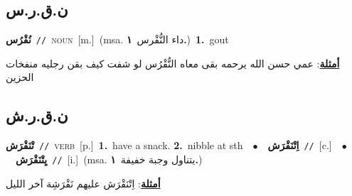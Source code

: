 \documentclass[10pt,a4paper,twoside]{article} %
\begin{document}
\begin{multicols}{2}
\vspace{-3mm}
\subsection*{\color{blue}\foreignlanguage{arabic}{ن.ق.ر.س}\color{blue}{}} 

{\setlength\topsep{0pt}\textbf{\foreignlanguage{arabic}{نُقْرُس}}\ {\color{gray}\texttt{//}\color{black}}\ \textsc{noun}\ [m.]\ \color{gray}(msa. \foreignlanguage{arabic}{داء النُّقْرس}~\foreignlanguage{arabic}{\textbf{١.}})\color{black}\ \textbf{1.}~gout\  \begin{flushright}\color{gray}\foreignlanguage{arabic}{\textbf{\underline{\foreignlanguage{arabic}{أمثلة}}}: عمي حسن الله يرحمه بقى معاه النُّقْرُس لو شفت كيف بقن رجليه منفخات الحزين}\end{flushright}\color{black}} \vspace{2mm}

\vspace{-3mm}
\subsection*{\color{blue}\foreignlanguage{arabic}{ن.ق.ر.ش}\color{blue}{}} 

{\setlength\topsep{0pt}\textbf{\foreignlanguage{arabic}{تْنَقْرَش}}\ {\color{gray}\texttt{//}\color{black}}\ \textsc{verb}\ [p.]\ \textbf{1.}~have a snack.  \textbf{2.}~nibble at sth\ \ $\bullet$\ \ \setlength\topsep{0pt}\textbf{\foreignlanguage{arabic}{اِتْنَقْرَش}}\ {\color{gray}\texttt{//}\color{black}}\ [c.]\ \ $\bullet$\ \ \setlength\topsep{0pt}\textbf{\foreignlanguage{arabic}{يِتْنَقْرَش}}\ {\color{gray}\texttt{//}\color{black}}\ [i.]\ \color{gray}(msa. \foreignlanguage{arabic}{يتناول وجبة خفيفة}~\foreignlanguage{arabic}{\textbf{١.}})\color{black}\  \begin{flushright}\color{gray}\foreignlanguage{arabic}{\textbf{\underline{\foreignlanguage{arabic}{أمثلة}}}: اِتْنَقْرَش عليهم نَقْرَشِة آخر الليل}\end{flushright}\color{black}} \vspace{2mm}


\end{multicols}
\end{document}
